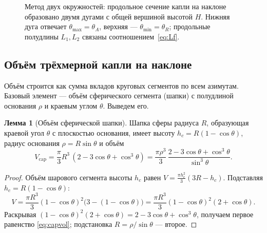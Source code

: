 \documentclass[11pt]{article}
\newcommand{\thA}{\theta_{A}}
\newcommand{\thR}{\theta_{R}}
\theoremstyle{definition}
\newtheorem{lemma}{Лемма}
\begin{document}
\begin{figure}[H]
\centering
{}
\caption{Метод двух окружностей: продольное сечение капли на наклоне образовано
двумя дугами с общей вершиной высотой $H$. Нижняя дуга отвечает
$\theta_{\max}=\thA$, верхняя --- $\theta_{\min}=\thR$; продольные
полудлины $L_{1},L_{2}$ связаны соотношением~\eqref{eq:Lf}.}
\label{fig:twocircle}
\end{figure}

\subsection{Объём трёхмерной капли на наклоне}
Объём строится как сумма вкладов круговых сегментов по всем азимутам. Базовый
элемент --- объём сферического сегмента (шапки) с полудлиной основания $\rho$ и
краевым углом $\theta$. Выведем его.

\begin{lemma}[Объём сферической шапки]
Шапка сферы радиуса $R$, образующая краевой угол $\theta$ с плоскостью основания,
имеет высоту $h_{c}=R(1-\cos\theta)$, радиус основания $\rho=R\sin\theta$ и объём
\begin{equation}
V_{\mathrm{cap}}=\frac{\pi}{3}R^{3}\,(2-3\cos\theta+\cos^{3}\theta)
=\frac{\pi\rho^{3}}{3}\,\frac{2-3\cos\theta+\cos^{3}\theta}{\sin^{3}\theta}.
\label{eq:capvol}
\end{equation}
\end{lemma}
\begin{proof}
Объём шарового сегмента высоты $h_{c}$ равен
$V=\tfrac{\pi h_{c}^{2}}{3}(3R-h_{c})$. Подставляя $h_{c}=R(1-\cos\theta)$:
\[
V=\frac{\pi R^{3}}{3}(1-\cos\theta)^{2}\big(3-(1-\cos\theta)\big)
=\frac{\pi R^{3}}{3}(1-\cos\theta)^{2}(2+\cos\theta).
\]
Раскрывая $(1-\cos\theta)^{2}(2+\cos\theta)=2-3\cos\theta+\cos^{3}\theta$, получаем
первое равенство \eqref{eq:capvol}; подстановка $R=\rho/\sin\theta$ --- второе.
\end{proof}
\end{document}
